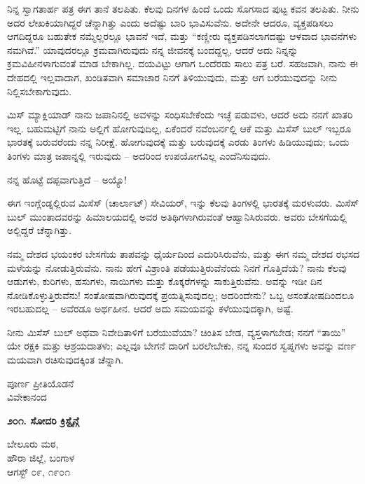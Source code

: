 ನಿನ್ನ ಸ್ವಾಗತಾರ್ಹ ಪತ್ರ ಈಗ ತಾನೆ ತಲಪಿತು. ಕೆಲವು ದಿನಗಳ ಹಿಂದೆ ಒಂದು ಸೊಗಸಾದ ಪುಟ್ಟ ಕವನ ತಲಪಿತು. ನೀನು ಅದರ ಲೇಖಕಿಯಾಗಿದ್ದರೆ ಚೆನ್ನಾಗಿತ್ತು ಎಂದು ಅದೆಷ್ಟು ಬಾರಿ ಭಾವಿಸುವೆನು. ಅದೇನೇ ಆದರೂ, ವ್ಯಕ್ತಪಡಿಸಲು ಆಗದಿದ್ದರೂ ಬಹುತೇಕ ನಮ್ಮೆಲ್ಲರಲ್ಲೂ ಭಾವನೆ ಇದೆ, ಮತ್ತು “ಕಣ್ಣೀರು ವ್ಯಕ್ತಪಡಿಸಲಾಗದಷ್ಟು ಆಳವಾದ ಭಾವನೆಗಳು ನಮಗಿವೆ.” ಯಾವುದರಲ್ಲೂ ಕ್ರಮವಾಗಿರುವುದು ನನ್ನ ಜೀವನಕ್ಕೆ ಬಂದದ್ದಲ್ಲ, ಆದರೆ ಅದು ನಿನ್ನನ್ನು ಕ್ರಮವಿಹೀನಳಾಗುವಂತೆ ಮಾಡ ಬೇಕಾಗಿಲ್ಲ. ದಯವಿಟ್ಟು ಆಗಾಗ ಒಂದೆರಡು ಸಾಲು ಪತ್ರ ಬರೆ. ಸಹಜವಾಗಿ, ನಾನು ಈ ದೇಹದಲ್ಲಿ ಇಲ್ಲವಾದಾಗ, ಖಂಡಿತವಾಗಿ ಸಮಾಚಾರ ನಿನಗೆ ತಿಳಿಯುವುದು, ಮತ್ತು ಆಗ ಬರೆಯುವುದನ್ನು ನೀನು ನಿಲ್ಲಿಸಬೇಕಾಗುವುದು.

ಮಿಸ್ ಮ್ಯಾಕ್ಲಿಯಾಡ್ ನಾನು ಜಪಾನಿನಲ್ಲಿ ಅವಳನ್ನು ಸಂಧಿಸಬೇಕೆಂದು ಇಚ್ಛೆ ಪಡುವಳು, ಆದರೆ ಅದು ನನಗೆ ಖಾತರಿ ಇಲ್ಲ. ಬಹುಮಟ್ಟಿಗೆ ನಾನು ಅಲ್ಲಿಗೆ ಹೋಗುವುದಿಲ್ಲ, ಏಕೆಂದರೆ ನವೆಂಬರ್ನಲ್ಲಿ ಆಕೆ ಮತ್ತು ಮಿಸೆಸ್ ಬುಲ್ ಇಬ್ಬರೂ ಭಾರತಕ್ಕೆ ಬರುವರೆಂದು ನನ್ನ ನಿರೀಕ್ಷೆ. ಹೋಗುವುದಕ್ಕೆ ಮತ್ತು ಬರುವುದಕ್ಕೆ ಎರಡು ತಿಂಗಳು ಹಿಡಿಯುವುದು; ಒಂದು ತಿಂಗಳು ಮಾತ್ರ ಜಪಾನ್ನಲ್ಲಿ ಇರುವುದು – ಅದರಿಂದ ಉಪಯೋಗವಿಲ್ಲ ಎಂದೆನಿಸುವುದು.

ನನ್ನ ಹೊಟ್ಟೆ ದಪ್ಪವಾಗುತ್ತಿದೆ – ಅಯ್ಯೊ!

ಈಗ ಇಂಗ್ಲೆಂಡ್ನಲ್ಲಿರುವ ಮಿಸೆಸ್ (ಚಾರ್ಲಾಟ್) ಸೇವಿಯರ್, ಇನ್ನು ಕೆಲವು ತಿಂಗಳಲ್ಲಿ ಭಾರತಕ್ಕೆ ಮರಳುವರು. ಮಿಸೆಸ್ ಬುಲ್ ಮುಂತಾದವರನ್ನು ಹಿಮಾಲಯದಲ್ಲಿ ಅವರ ಅತಿಥಿಗಳಾಗಿರುವಂತೆ ಆಹ್ವಾನಿಸಿರುವರು. ಅವರು ಬೇಸಗೆಯಲ್ಲಿ ಅಲ್ಲಿದ್ದರೆ ಚೆನ್ನಾಗಿತ್ತು.

ನಮ್ಮ ದೇಶದ ಭಯಂಕರ ಬೇಸಗೆಯ ತಾಪವನ್ನು ಧೈರ್ಯದಿಂದ ಎದುರಿಸಿರುವೆನು, ಮತ್ತು ಈಗ ನಮ್ಮ ದೇಶದ ರಭಸದ ಮಳೆಯನ್ನು ನೋಡುತ್ತಿರುವೆನು. ನಾನು ಹೇಗೆ ವಿಶ್ರಾಂತಿ ಪಡೆಯುತ್ತಿರುವೆನೆಂದು ನಿನಗೆ ಗೊತ್ತಿದೆಯೆ? ನಾನು ಕೆಲವು ಆಡುಗಳು, ಕುರಿಗಳು, ಹಸುಗಳು, ನಾಯಿಗಳು ಮತ್ತು ಕೊಕ್ಕರೆಗಳನ್ನು ಸಾಕುತ್ತಿರುವೆನು. ಅವನ್ನು ಇಡೀ ದಿನ ನೋಡಿಕೊಳ್ಳುತ್ತಿರುವೆನು! ಸಂತೋಷವಾಗಿರುವುದಕ್ಕೆ ಪ್ರಯತ್ನಿಸುವುದಲ್ಲ; ಅದರಿಂದೇನು? ಒಬ್ಬ ಅಸಂತೋಷದಿಂದಲೂ ಇರಬಹುದಲ್ಲ – ಅವೆರಡೂ ಅರ್ಥಹೀನ. ಆದರೆ ಅದು ಸಮಯವನ್ನು ಕಳೆಯುವುದಕ್ಕಾಗಿ, ಅಷ್ಟೆ.

ನೀನು ಮಿಸೆಸ್ ಬುಲ್ ಅಥವಾ ನಿವೇದಿತಾಳಿಗೆ ಬರೆಯುವೆಯಾ? ಚಿಂತಿಸ ಬೇಡ, ವ್ಯಸ್ತಳಾಗಬೇಡ; ನನಗೆ “ತಾಯಿ” ಯೇ ರಕ್ಷಕಿ ಮತ್ತು ಆಶ್ರಯದಾತಳು; ಎಲ್ಲವೂ ಬೇಗನೆ ದಾರಿಗೆ ಬರಲೇಬೇಕು, ನನ್ನ ಸುಂದರ ಸ್ವಪ್ನಗಳು ಅವನ್ನು ವರ್ಣ ಮಯವಾಗಿ ರಚಿಸುವುದಕ್ಕಿಂತ ಚೆನ್ನಾಗಿ.

\begin{flushright}
ಪೂರ್ಣ ಪ್ರೀತಿಯೊಡನೆ\\ವಿವೇಕಾನಂದ
\end{flushright}

\begin{center}
\textbf{೨೦೧. ಸೋದರಿ ಕ್ರಿಸ್ಟೈನ್ಗೆ}
\end{center}

\begin{flushright}
ಬೇಲೂರು ಮಠ,\\ಹೌರಾ ಜಿಲ್ಲೆ, ಬಂಗಾಳ\\ಆಗಸ್ಟ್ ೦೯, ೧೯೦೧
\end{flushright}

